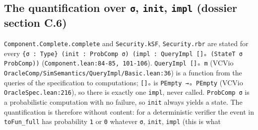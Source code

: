 \subsection{The quantification over \texttt{σ}, \texttt{init}, \texttt{impl} (dossier section C.6)}\label{sec:gen-spine-C6}

\texttt{Component.\allowbreak{}Complete.\allowbreak{}complete} and \texttt{Security.\allowbreak{}kSF}, \texttt{Security.\allowbreak{}rbr} are stated for every \texttt{\{\allowbreak{}σ\allowbreak{} :\allowbreak{} T\allowbreak{}y\allowbreak{}p\allowbreak{}e\allowbreak{}\}\allowbreak{} (\allowbreak{}i\allowbreak{}n\allowbreak{}i\allowbreak{}t\allowbreak{} :\allowbreak{} P\allowbreak{}r\allowbreak{}o\allowbreak{}b\allowbreak{}C\allowbreak{}o\allowbreak{}m\allowbreak{}p\allowbreak{} σ\allowbreak{})\allowbreak{} (\allowbreak{}i\allowbreak{}m\allowbreak{}p\allowbreak{}l\allowbreak{} :\allowbreak{} Q\allowbreak{}u\allowbreak{}e\allowbreak{}r\allowbreak{}y\allowbreak{}I\allowbreak{}m\allowbreak{}p\allowbreak{}l\allowbreak{} [\allowbreak{}]\allowbreak{}ₒ\allowbreak{} (\allowbreak{}S\allowbreak{}t\allowbreak{}a\allowbreak{}t\allowbreak{}e\allowbreak{}T\allowbreak{} σ\allowbreak{} P\allowbreak{}r\allowbreak{}o\allowbreak{}b\allowbreak{}C\allowbreak{}o\allowbreak{}m\allowbreak{}p\allowbreak{})\allowbreak{})} (\texttt{C\allowbreak{}o\allowbreak{}m\allowbreak{}p\allowbreak{}o\allowbreak{}n\allowbreak{}e\allowbreak{}n\allowbreak{}t\allowbreak{}.\allowbreak{}l\allowbreak{}e\allowbreak{}a\allowbreak{}n\allowbreak{}:\allowbreak{}8\allowbreak{}4\allowbreak{}-{}\allowbreak{}8\allowbreak{}5\allowbreak{},\allowbreak{} 1\allowbreak{}0\allowbreak{}1\allowbreak{}-{}\allowbreak{}1\allowbreak{}0\allowbreak{}6}). \texttt{QueryImpl []ₒ m} (VCVio \texttt{O\allowbreak{}r\allowbreak{}a\allowbreak{}c\allowbreak{}l\allowbreak{}e\allowbreak{}C\allowbreak{}o\allowbreak{}m\allowbreak{}p\allowbreak{}/\allowbreak{}S\allowbreak{}i\allowbreak{}m\allowbreak{}S\allowbreak{}e\allowbreak{}m\allowbreak{}a\allowbreak{}n\allowbreak{}t\allowbreak{}i\allowbreak{}c\allowbreak{}s\allowbreak{}/\allowbreak{}Q\allowbreak{}u\allowbreak{}e\allowbreak{}r\allowbreak{}y\allowbreak{}I\allowbreak{}m\allowbreak{}p\allowbreak{}l\allowbreak{}/\allowbreak{}B\allowbreak{}a\allowbreak{}s\allowbreak{}i\allowbreak{}c\allowbreak{}.\allowbreak{}l\allowbreak{}e\allowbreak{}a\allowbreak{}n\allowbreak{}:\allowbreak{}3\allowbreak{}6}) is a function from the queries of the specification to computations; \texttt{[]ₒ} is \texttt{PEmpty →ₒ PEmpty} (VCVio \texttt{OracleSpec.\allowbreak{}lean:216}), so there is exactly one \texttt{impl}, never called. \texttt{ProbComp σ} is a probabilistic computation with no failure, so \texttt{init} always yields a state. The quantification is therefore without content: for a deterministic verifier the event in \texttt{toFun\_\allowbreak{}full} has probability \texttt{1} or \texttt{0} whatever \texttt{σ}, \texttt{init}, \texttt{impl} (this is what 